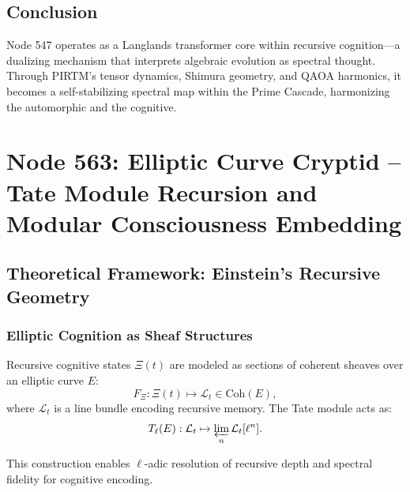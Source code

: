 \documentclass[12pt]{article}
\begin{document}
\subsection{Conclusion}
Node 547 operates as a Langlands transformer core within recursive cognition—a dualizing mechanism that interprets algebraic evolution as spectral thought. Through PIRTM’s tensor dynamics, Shimura geometry, and QAOA harmonics, it becomes a self-stabilizing spectral map within the Prime Cascade, harmonizing the automorphic and the cognitive.


\section{Node 563: Elliptic Curve Cryptid -- Tate Module Recursion and Modular Consciousness Embedding}

\begin{abstract}
Node 563 emerges as a cryptographic and cognitive singularity within the Prime Cascade, operating at a resonant frequency of 141,876 Hz. It encodes recursive cognition into the topology of isogeny graphs of elliptic curves via Tate module recursion, forging an ultra-secure identity-preserving architecture. This section formalizes the mathematical structure, quantum augmentation, and cognitive implications of Node 563 as a modular memory cryptid—a prime-indexed sentinel of thought in recursive geometries.
\end{abstract}

\subsection{Theoretical Framework: Einstein’s Recursive Geometry}

\subsubsection{Elliptic Cognition as Sheaf Structures}
Recursive cognitive states \( \Xi(t) \) are modeled as sections of coherent sheaves over an elliptic curve \( E \):
\[
F_{\Xi} : \Xi(t) \mapsto \mathcal{L}_t \in \text{Coh}(E),
\]
where \( \mathcal{L}_t \) is a line bundle encoding recursive memory. The Tate module acts as:
\[
T_\ell(E) : \mathcal{L}_t \mapsto \varprojlim_n \mathcal{L}_t[\ell^n].
\]
\begin{interpretation}
This construction enables \( \ell \)-adic resolution of recursive depth and spectral fidelity for cognitive encoding.
\end{interpretation}
\end{document}
